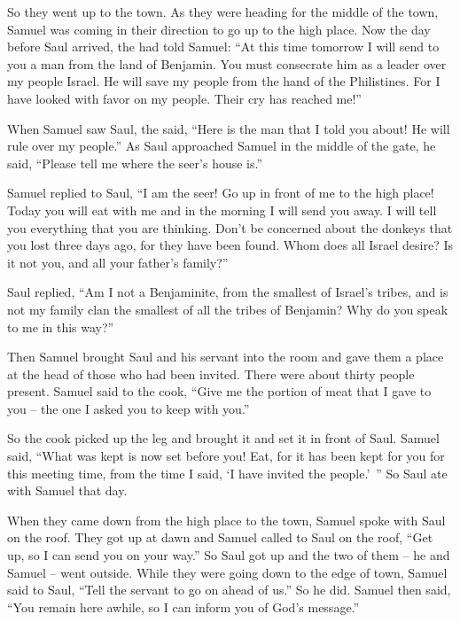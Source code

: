 {\par }{\PP {}So they went up
to the town.
As they
were heading
for the middle
of the town,
Samuel
was coming
in their direction
to go up
to the high place.
Now the day
before
Saul
arrived,
the {}
had told
Samuel:
“At this time
tomorrow
I will send
to
you a man
from the land
of Benjamin.
You must consecrate
him as a leader
over
my people
Israel.
He will save
my people
from the hand
of the Philistines.
For
I have looked
with favor on
my people.
Their cry
has reached
me!”
\par }{\PP {}When Samuel
saw
Saul,
the {}
said, “Here
is the man
that
I told
you about! He will rule
over my people.”
As Saul
approached
Samuel
in the middle
of the gate,
he said,
“Please
tell
me where
the seer’s
house is.”
\par }{\PP {}Samuel
replied
to Saul,
“I am
the seer! Go up
in front
of me to the high place! Today
you will eat
with
me and in the morning
I will send
you away. I will tell
you everything
that
you are thinking.
Don’t
be concerned
about the donkeys
that you lost
three
days
ago, for
they have been found.
Whom
does all
Israel
desire? Is it not
you, and all
your father’s
family?”
\par }{\PP {}Saul
replied,
“Am I
not
a Benjaminite,
from the smallest
of Israel’s
tribes,
and is not my family
clan
the smallest
of all
the tribes
of Benjamin? Why
do you speak
to me
in this
way?”
\par }{\PP {}Then Samuel
brought
Saul
and his servant
into the room
and gave
them a place
at the head
of those who had been invited.
There were about thirty
people present.
Samuel
said
to the cook,
“Give
me the portion
of meat that
I gave to you – the one I asked you to keep with you.”
\par }{\PP {}So
the cook
picked
up the leg
and brought it
and set
it in front
of Saul.
Samuel said,
“What
was kept
is now
set
before
you! Eat,
for
it has been kept
for you for this meeting
time, from the time I said,
‘I have invited
the people.’ ”
So Saul
ate
with
Samuel
that day.
\par }{\PP {}When they came down
from the high place
to the town,
Samuel spoke
with
Saul
on
the roof.
They got
up
at dawn
and Samuel
called
to
Saul
on the roof,
“Get
up, so I can send
you on your way.” So Saul
got
up and the two
of them
– he
and Samuel
– went
outside.
While they
were going down
to the edge
of town,
Samuel
said to
Saul,
“Tell
the servant
to go
on ahead
of us.” So
he did. Samuel
then said, “You
remain
here awhile,
so I can inform
you of God’s
message.”

}
